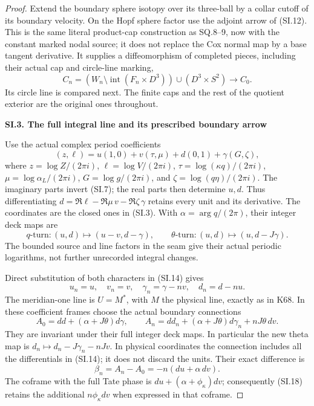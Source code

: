 \begin{proof}
Extend the boundary sphere isotopy over its three-ball by a collar
cutoff of its boundary velocity. On the Hopf sphere factor use the
adjoint arrow of (SI.12). This is the same literal product-cap
construction as SQ.8--9, now with the constant marked nodal source;
it does not replace the Cox normal map by a base tangent derivative.
It supplies a diffeomorphism of completed pieces, including their
actual cap and circle-line marking,
\[
 C_n=(W_n\setminus\operatorname{int}(F_n\times D^3))
                      \cup(D^3\times S^2)\longrightarrow C_0.
                                                        \tag{SI.13}
\]
Its circle line is compared next. The finite caps and the rest of the
quotient exterior are the original ones throughout.

\par

\medskip\noindent\textbf{SI.3. The full integral line and its prescribed boundary arrow}

\par\nobreak

Use the actual complex period coefficients
\[
 (z,\ell)=u(1,0)+v(\tau,\mu)+d(0,1)+\gamma(G,\zeta),
                                                        \tag{SI.14}
\]
where \(z=\log Z/(2\pi i)\), \(\ell=\log V/(2\pi i)\),
\(\tau=\log(\kappa q)/(2\pi i)\), \(\mu=\log\alpha_L/(2\pi i)\),
\(G=\log g/(2\pi i)\), and \(\zeta=\log(q\eta)/(2\pi i)\).
The imaginary parts invert (SI.7); the real parts then determine
\(u,d\). Thus differentiating \(d=\Re\ell-\Re\mu\,v-\Re\zeta\,\gamma\)
retains every unit and its derivative. The coordinates are the closed
ones in (SI.3). With \(\alpha=\arg q/(2\pi)\), their integer deck maps are
\[
 q\text{-turn}:(u,d)\mapsto(u-v,d-\gamma),\qquad
 \theta\text{-turn}:(u,d)\mapsto(u,d-J\gamma).
                                                        \tag{SI.15}
\]
The bounded source and line factors in the seam give their actual
periodic logarithms, not further unrecorded integral changes.

Direct substitution of both characters in (SI.14) gives
\[
 u_n=u,\quad v_n=v,\quad\gamma_n=\gamma-nv,\quad d_n=d-nu.
                                                        \tag{SI.16}
\]
The meridian-one line is \(U=M^*\), with \(M\) the physical line, exactly
as in K68. In these coefficient frames choose the actual boundary
connections
\[
 A_0=dd+(\alpha+J\theta)d\gamma,\qquad
 A_n=dd_n+(\alpha+J\theta)d\gamma_n+nJ\theta\,dv.
                                                        \tag{SI.17}
\]
They are invariant under their full integer deck maps. In particular
the new theta map is \(d_n\mapsto d_n-J\gamma_n-nJv\). In physical
coordinates the connection includes all the differentials in
(SI.14); it does not discard the units. Their exact difference is
\[
 \beta_n=A_n-A_0=-n(du+\alpha\,dv).                  \tag{SI.18}
\]
The coframe with the full Tate phase is
\(du+(\alpha+\phi_\kappa)dv\); consequently (SI.18) retains the
additional \(n\phi_\kappa dv\) when expressed in that coframe.


\end{proof}

